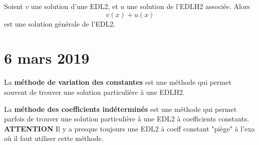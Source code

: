 \documentclass{report}
\begin{document}
\begin{thm}
	Soient $v$ une solution d'une EDL2, et $u$ une solution de l'EDLH2 associée. Alors
	\begin{equation}
		v(x) + u(x)
	\end{equation}
	est une solution générale de l'EDL2.
\end{thm}

\section{6 mars 2019}

\begin{defn}
	La \textbf{méthode de variation des constantes} est une méthode qui permet souvent de trouver une solution particulière à une EDLH2.
\end{defn}

\begin{defn}
	La \textbf{méthode des coefficients indéterminés} est une méthode qui permet parfois de trouver une solution particulière à une EDL2 à coefficients constants. \textbf{ATTENTION} Il y a presque toujours une EDL2 à coeff constant "piège" à l'exa où il faut utiliser cette méthode.
\end{defn}
\end{document}
